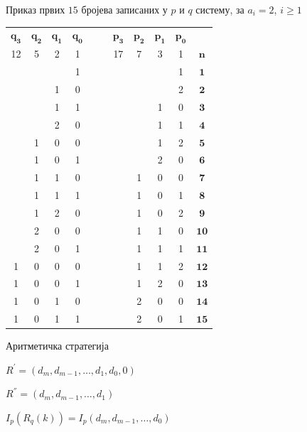 \documentclass[10pt]{beamer}
\begin{document}
	\begin{frame}{Приказ првих $ 15 $ бројева записаних у $ p $ и $ q $ систему, за $ a_{i} = 2 $, $ i \geq 1 $}
		\begin{table}[h!]
			\begin{center}
				\begin{tabular}{ | c | c | c | c | c  c | c | c | c | c | c |}
					\hline
					{$ \mathbf{q_{3}} $} &  {$ \mathbf{q_{2}} $} &  {$ \mathbf{q_{1}} $} &  {$ \mathbf{q_{0}} $} & & &  {$ \mathbf{p_{3}} $} &  {$ \mathbf{p_{2}} $} &  {$ \mathbf{p_{1}} $} &  {$ \mathbf{p_{0}} $} &\\
					12 & 5 & 2 & 1 & & & 17 & 7 & 3 & 1 &  {$ \mathbf{n} $}\\
					\hline
					&  &  & 1 & & &  &  &  & 1 & {$ \mathbf{1} $}\\
					&  & 1 & 0 & & &  &  &  & 2 & {$ \mathbf{2} $}\\
					&  & 1 & 1 & & &  &  & 1 & 0 &  {$ \mathbf{3} $}\\
					&  & 2 & 0 & & &  &  & 1 & 1 &  {$ \mathbf{4} $}\\
					& 1 & 0 & 0 & & &  &  & 1 & 2 &  {$ \mathbf{5} $}\\
					& 1 & 0 & 1 & & &  &  & 2 & 0 &  {$ \mathbf{6} $}\\
					& 1 & 1 & 0 & & &  & 1 & 0 & 0 &  {$ \mathbf{7} $}\\
					& 1 & 1 & 1 & & &  & 1 & 0 & 1 &  {$ \mathbf{8} $}\\
					& 1 & 2 & 0 & & &  & 1 & 0 & 2 &  {$ \mathbf{9} $}\\
					& 2 & 0 & 0 & & &  & 1 & 1 & 0 &  {$ \mathbf{10} $}\\
					& 2 & 0 & 1 & & &  & 1 & 1 & 1 &  {$ \mathbf{11} $}\\
					1 & 0 & 0 & 0 & & & & 1 & 1 & 2 &  {$ \mathbf{12} $}\\
					1 & 0 & 0 & 1 & & & & 1 & 2 & 0 &  {$ \mathbf{13} $}\\
					1 & 0 & 1 & 0 & & & & 2 & 0 & 0 &  {$ \mathbf{14} $}\\
					1 & 0 & 1 & 1 & & & & 2 & 0 & 1 &  {$ \mathbf{15} $}\\
					\hline 
				\end{tabular}
			\end{center}
		\end{table}
	\end{frame}
	
	\begin{frame}{Аритметичка стратегија}
		\begin{tcolorbox}[title=Леви померај репрезентације $ R $ је:]
			$ R^{'} = (d_{m}, d_{m-1}, \ldots , d_{1}, d_{0}, 0) $
		\end{tcolorbox}
		\begin{tcolorbox}[title=Десни померај репрезентације $ R $ је:]
			$ R^{''} = (d_{m}, d_{m-1}, \ldots , d_{1}) $
		\end{tcolorbox}
		\begin{tcolorbox}[title=Веза $ p $-интерпретације $ I_{p} $ и $ q $-репрезентације $ R_{q} $ је:]
			$ I_{p}(R_{q}(k)) = I_{p}(d_{m}, d_{m-1}, \ldots, d_{0}) $
		\end{tcolorbox}
	\end{frame}
	
\end{document}
